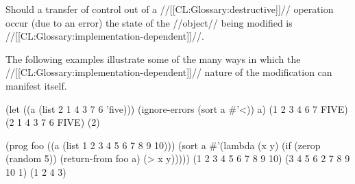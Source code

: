 Should a transfer of control out of a //[[CL:Glossary:destructive]]// operation occur (\eg due to an error) the state of the //object// being modified is //[[CL:Glossary:implementation-dependent]]//.


The following examples illustrate some of the many ways in which the //[[CL:Glossary:implementation-dependent]]// nature of the modification can manifest itself.

\code
 (let ((a (list 2 1 4 3 7 6 'five)))
   (ignore-errors (sort a #'<))
   a) \EV (1 2 3 4 6 7 FIVE) \OV (2 1 4 3 7 6 FIVE) \OV (2)

 (prog foo ((a (list 1 2 3 4 5 6 7 8 9 10)))
   (sort a #'(lambda (x y) (if (zerop (random 5)) (return-from foo a) (> x y))))) \EV (1 2 3 4 5 6 7 8 9 10) \OV (3 4 5 6 2 7 8 9 10 1) \OV (1 2 4 3) \endcode

\endsubsubsection%

\endsubsection%

